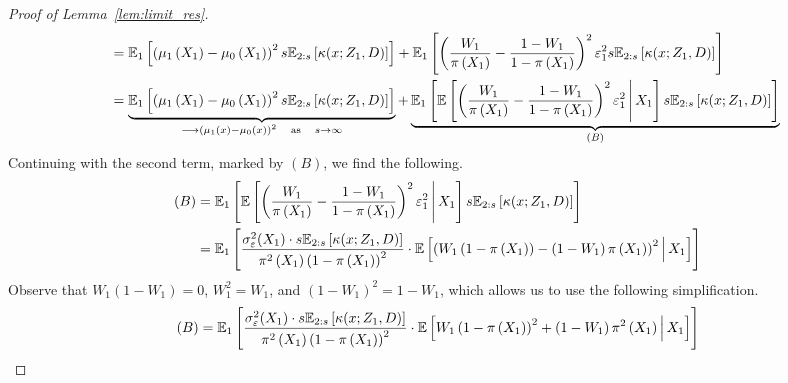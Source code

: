 \begin{proof}[Proof of Lemma~\ref{lem:limit_res}]
\begin{equation}
\begin{aligned}
			 & \quad =  \mathbb{E}_{1}\left[\left(\mu_1\left(X_{1}\right) - \mu_0\left(X_{1}\right)\right)^2 s \mathbb{E}_{2:s}\left[\kappa(x; Z_1, D)\right]\right]
			+ \mathbb{E}_{1}\left[\left(\frac{W_{1}}{\pi\left(X_1\right)} - \frac{1 - W_{1}}{1 - \pi\left(X_1\right)}\right)^2 \varepsilon_{1}^2 s \mathbb{E}_{2:s}\left[\kappa(x; Z_1, D)\right]\right]                                                                                               \\
			 & \quad = \underbrace{\mathbb{E}_{1}\left[\left(\mu_1\left(X_{1}\right) - \mu_0\left(X_{1}\right)\right)^2 s \mathbb{E}_{2:s}\left[\kappa(x; Z_1, D)\right]\right]}_{\longrightarrow \left(\mu_1\left(x\right) - \mu_0\left(x\right)\right)^2 \quad \text{as} \quad s \rightarrow \infty}
			+ \underbrace{\mathbb{E}_{1}\left[\mathbb{E}\left[\left(\frac{W_{1}}{\pi\left(X_1\right)} - \frac{1 - W_{1}}{1 - \pi\left(X_1\right)}\right)^2 \varepsilon_{1}^2 \, \middle| \, X_1\right] s \mathbb{E}_{2:s}\left[\kappa(x; Z_1, D)\right]\right]}_{(B)}
		\end{aligned}
	\end{equation}
	Continuing with the second term, marked by $(B)$, we find the following.
	\begin{equation}
		\begin{aligned}
			(B)
			 & = \mathbb{E}_{1}\left[\mathbb{E}\left[\left(\frac{W_{1}}{\pi\left(X_1\right)} - \frac{1 - W_{1}}{1 - \pi\left(X_1\right)}\right)^2 \varepsilon_{1}^2 \, \middle| \, X_1\right] s \mathbb{E}_{2:s}\left[\kappa(x; Z_1, D)\right]\right] \\
			 & = \mathbb{E}_{1}\left[\frac{\sigma_{\varepsilon}^2(X_1) \cdot s \mathbb{E}_{2:s}\left[\kappa(x; Z_1, D)\right]}{\pi^2\left(X_1\right)\left(1 - \pi\left(X_1\right)\right)^2} \cdot
			\mathbb{E}\left[\left(W_{1}\left(1 - \pi\left(X_1\right)\right) - \left(1 - W_{1}\right)\pi\left(X_1\right)\right)^2 \, \middle| \, X_1\right] \right]                                                                    \\
		\end{aligned}
	\end{equation}
	Observe that $W_1(1-W_1) = 0$, $W_1^2 = W_1$, and $(1-W_1)^2 = 1 - W_1$, which allows us to use the following simplification.
	\begin{equation}
		\begin{aligned}
			(B)
			 & = \E_{1}\left[\frac{\sigma_{\varepsilon}^2(X_1) \cdot s \E_{2:s}\left[\kappa(x; Z_1, D)\right]}{\pi^2\left(X_1\right)\left(1 - \pi\left(X_1\right)\right)^2} \cdot
			\E\left[W_{1}\left(1 - \pi\left(X_1\right)\right)^2 + \left(1 - W_{1}\right)\pi^2\left(X_1\right) \, \middle| \, X_1\right] \right]                                   \\

\end{aligned}
\end{equation}
\end{proof}
